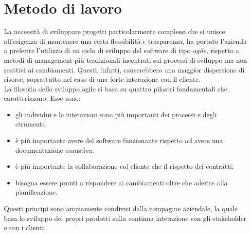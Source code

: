 \section{Metodo di lavoro}
La necessità di sviluppare progetti particolarmente complessi che si unisce all'esigenza di mantenere una certa flessibilità e trasparenza, ha portato l'azienda a preferire l'utilizzo di un ciclo di sviluppo del software di tipo \emph{agile}, rispetto a metodi di management più tradizionali incentrati sui processi di sviluppo ma non reattivi ai cambiamenti. Questi, infatti, causerebbero una maggior dispersione di risorse, soprattutto nel caso di una forte interazione con il cliente.\\
La filosofia dello sviluppo agile si basa su quattro pilastri fondamentali che caratterizzano.  Esse sono:
\begin{itemize}
	\item gli individui e le interazioni sono più importanti dei processi e degli strumenti;
	\item è più importante avere del software funzionante rispetto ad avere una documentazione esaustiva;
	\item è più importante la collaborazione col cliente che il rispetto dei contratti;
	\item bisogna essere pronti a rispondere ai cambiamenti oltre che aderire alla pianificazione.
\end{itemize}
Questi principi sono ampiamente condivisi dalla compagine aziendale, la quale basa lo sviluppo dei propri prodotti sulla continua interazione con gli stakeholder e con i clienti.

